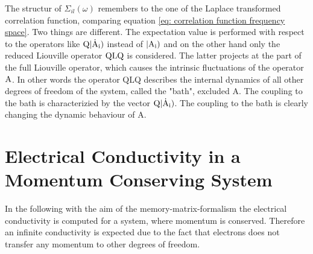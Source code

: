 The structur of $\Sigma_{il}(\omega)$ remembers to the one of the Laplace transformed correlation function, comparing equation \eqref{eq: correlation function frequency space}.
Two things are different.
The expectation value is performed with respect to the operators like $\mathrm{Q}|\mathrm{\dot{\mathrm{A}}_{i}})$ instead of $|\mathrm{\mathrm{A}_{i}})$ and on the other hand only the reduced Liouville operator $\mathrm{QLQ}$ is considered.
The latter projects at the part of the full Liouville operator, which causes the intrinsic fluctuations of the operator $\mathrm{A}$.
In other words the operator QLQ describes the internal dynamics of all other degrees of freedom of the system, called the "bath", excluded A.
The coupling to the bath is characterizied by the vector $\mathrm{Q}|\mathrm{\dot{\mathrm{A}}_{i}})$.
The coupling to the bath is clearly changing the dynamic behaviour of A.
%
%
\section{Electrical Conductivity in a Momentum Conserving System}
\label{sec:conductivity conserved momentum}
%
%
In the following with the aim of the memory-matrix-formalism the electrical conductivity is computed for a system, where momentum is conserved.
Therefore an infinite conductivity is expected due to the fact that electrons does not transfer any momentum to other degrees of freedom.





























